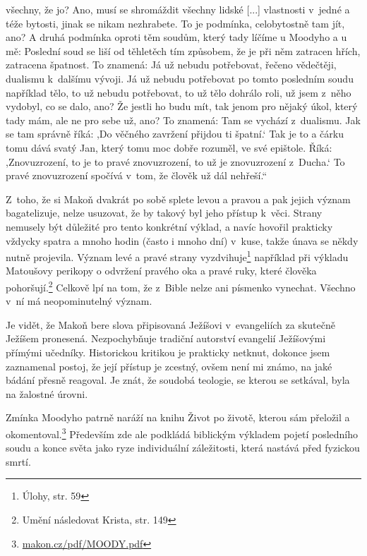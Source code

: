 \begin{enumerate}
{{všechny, že jo? Ano, musí se shromáždit všechny lidské [...]
vlastnosti v~jedné a téže bytosti, jinak se nikam nezhrabete. To
je podmínka, celobytostně tam jít, ano? A druhá podmínka oproti těm soudům,
který tady líčíme u Moodyho a u mě: Poslední soud se liší od těhletěch tím
způsobem, že je při něm zatracen hřích, zatracena špatnost. To znamená: Já už
nebudu potřebovat, řečeno vědečtěji, dualismu k~dalšímu vývoji. Já už nebudu
potřebovat po tomto posledním soudu například tělo, to už nebudu potřebovat, to
už tělo dohrálo roli, už jsem z~něho vydobyl, co se dalo, ano? Že jestli ho budu
mít, tak jenom pro nějaký úkol, který tady mám, ale ne pro sebe už, ano? To
znamená: Tam se vychází z~dualismu. Jak se tam správně říká: ,Do věčného
zavržení přijdou ti špatní.` Tak je to a čárku tomu dává svatý Jan, který tomu
moc dobře rozuměl, ve své epištole. Říká: ,Znovuzrození, to je to pravé
znovuzrození, to už je znovuzrození z~Ducha.` To pravé znovuzrození spočívá
v~tom, že člověk už dál nehřeší.``
}

Z~toho, že si Makoň dvakrát po sobě splete levou a pravou a pak jejich význam
bagatelizuje, nelze usuzovat, že by takový byl jeho přístup k~věci. Strany
nemusely být důležité pro tento konkrétní výklad, a navíc hovořil prakticky
vždycky spatra a mnoho hodin (často i mnoho dní) v~kuse, takže únava se někdy
nutně projevila. Význam levé a pravé strany vyzdvihuje\footnote{Úlohy, str. 59} například při výkladu
Matoušovy perikopy o odvržení pravého oka a pravé ruky, které člověka
pohoršují.\footnote{Umění následovat Krista, str. 149}
Celkově lpí na tom, že z~Bible nelze ani písmenko vynechat. Všechno v~ní má
neopominutelný význam.

Je vidět, že Makoň bere slova připisovaná Ježíšovi v~evangeliích za skutečně
Ježíšem pronesená. Nezpochybňuje tradiční autorství evangelií Ježíšovými přímými
učedníky. Historickou kritikou je prakticky netknut, dokonce jsem zaznamenal
postoj, že její přístup je zcestný, ovšem není mi známo, na jaké bádání přesně
reagoval. Je znát, že soudobá teologie, se kterou se setkával, byla na žalostné
úrovni.

Zmínka Moodyho patrně naráží na knihu Život po životě,\cite{moody1975life}
kterou sám přeložil a okomentoval.\footnote{\href{http://makon.cz/pdf/MOODY.pdf}{makon.cz/pdf/MOODY.pdf}}
Především zde ale podkládá biblickým výkladem pojetí posledního soudu a konce
světa jako ryze individuální záležitosti, která nastává před fyzickou smrtí.

}

\end{enumerate}

